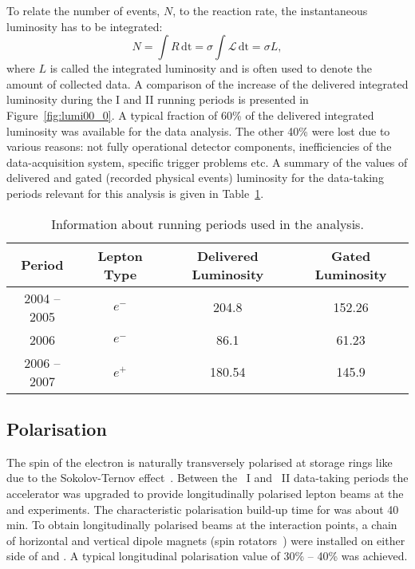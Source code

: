 To relate the number of events, $N$, to the reaction rate, the instantaneous luminosity has to be integrated:
\begin{equation}
	N = \int{R\,\mathrm{dt}} = \sigma\int{\mathcal{L}\,\mathrm{dt}} = \sigma L,
\end{equation}
where $L$ is called the integrated luminosity and is often used to denote the amount of collected data. A comparison of the increase of the delivered integrated luminosity during the \hera I and \hera II running periods is presented in Figure~\ref{fig:lumi00_0}. A typical fraction of 60\% of the delivered integrated luminosity was available for the data analysis. The other 40\% were lost due to various reasons: not fully operational detector components, inefficiencies of the data-acquisition system, specific trigger problems etc. A summary of the values of delivered and gated (recorded physical events) luminosity for the data-taking periods relevant for this analysis is given in Table~\ref{tab:heraruns}.

\begin{table}
	\centering
		\begin{tabular}[h]{|c|c|c|c|}
		  \hline
			Period & Lepton Type & Delivered Luminosity & Gated Luminosity \\
			\hline \hline
			2004 -- 2005 & $e^{-}$  & 204.8 \invpb  & 152.26 \invpb \T\B\\
			2006         & $e^{-}$  & 86.1 \invpb  &  61.23 \invpb \T\B\\
			2006 -- 2007 & $e^{+}$  & 180.54 \invpb  & 145.9 \invpb \T\B\\
			\hline
		\end{tabular}
	\caption{Information about \hera running periods used in the analysis.}
	\label{tab:heraruns}
\end{table}

\subsection{Polarisation}
\label{subsec:polarisation}
The spin of the electron is naturally transversely polarised at storage rings like \hera due to the Sokolov-Ternov effect~\cite{Sokolov:1963zn,Baier:1969hw}. Between the \hera~I and \hera~II data-taking periods the accelerator was upgraded to provide longitudinally polarised lepton beams at the \zeus and \hone experiments. The characteristic polarisation build-up time for \hera was about 40 min. To obtain longitudinally polarised beams at the interaction points, a chain of horizontal and vertical dipole magnets (spin rotators~\cite{Barber:1994ew}) were installed on either side of \zeus and \hone. A typical longitudinal polarisation value of 30\% -- 40\% was achieved.

